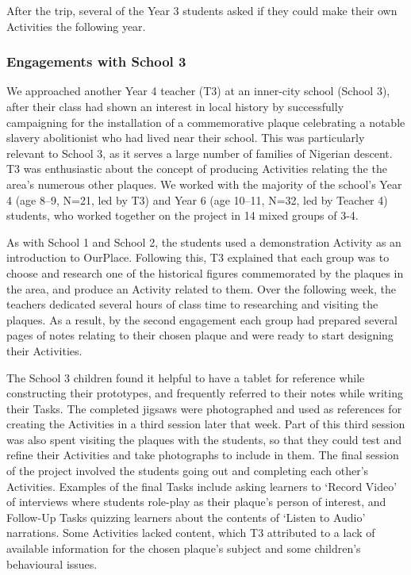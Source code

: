 After the trip, several of the Year 3 students asked if they could make their own Activities the following year.

\subsubsection{Engagements with School 3}
We approached another Year 4 teacher (T3) at an inner-city school (School 3), after their class had shown an interest in local history by successfully campaigning for the installation of a commemorative plaque celebrating a notable slavery abolitionist who had lived near their school. This was particularly relevant to School 3, as it serves a large number of families of Nigerian descent. T3 was enthusiastic about the concept of producing Activities relating the the area's numerous other plaques. We worked with the majority of the school's Year 4 (age 8--9, N=21, led by T3) and Year 6 (age 10--11, N=32, led by Teacher 4) students, who worked together on the project in 14 mixed groups of 3-4.

As with School 1 and School 2, the students used a demonstration Activity as an introduction to OurPlace. Following this, T3 explained that each group was to choose and research one of the historical figures commemorated by the plaques in the area, and produce an Activity related to them. Over the following week, the teachers dedicated several hours of class time to researching and visiting the plaques. As a result, by the second engagement each group had prepared several pages of notes relating to their chosen plaque and were ready to start designing their Activities.

The School 3 children found it helpful to have a tablet for reference while constructing their prototypes, and frequently referred to their notes while writing their Tasks. The completed jigsaws were photographed and used as references for creating the Activities in a third session later that week. Part of this third session was also spent visiting the plaques with the students, so that they could test and refine their Activities and take photographs to include in them. The final session of the project involved the students going out and completing each other's Activities. Examples of the final Tasks include asking learners to `Record Video' of interviews where students role-play as their plaque's person of interest, and Follow-Up Tasks quizzing learners about the contents of `Listen to Audio' narrations. Some Activities lacked content, which T3 attributed to a lack of available information for the chosen plaque's subject and some children's behavioural issues.

